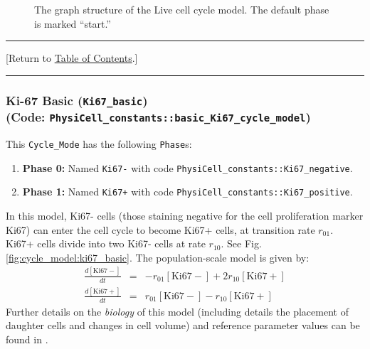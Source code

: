 \documentclass[12pt]{article}
\newcommand{\beqa}{\begin{eqnarray}}
\newcommand{\eeqa}{\end{eqnarray}}
\renewcommand{\v}{\verb}
\renewcommand{\t}[1]{\left[\mathrm{#1}\right]}
\newcommand{\TOClink}{\begin{center}\hrule\vskip-10pt\phantom{.}\hfill[Return to \hyperlink{TOC}{Table of Contents}.]\hfill\phantom{.}\vskip3pt\hrule\end{center}}
\begin{document}
\begin{figure}
\begin{mdframed}[style=mystyle]
\caption{The graph structure of the Live cell cycle model. The default phase is marked 
``start.''}
\label{fig:cycle_model:live}
\end{mdframed}
\end{figure}

\TOClink 

\subsubsection{Ki-67 Basic (\texttt{Ki67\_basic})\\
(Code: \texttt{PhysiCell\_constants::basic\_Ki67\_cycle\_model})}
\label{sec:Standard_Models:Ki67_Basic}
This \v|Cycle_Mode| has the following \v|Phase|s: 
\begin{enumerate}
\item 
\textbf{Phase 0:} Named \v|Ki67-| with code \v|PhysiCell_constants::Ki67_negative|. 

\item 
\textbf{Phase 1:} Named \v|Ki67+| with code \v|PhysiCell_constants::Ki67_positive|. 
\end{enumerate}

In this model, Ki67- cells (those staining negative for the 
cell proliferation marker Ki67) can enter the cell cycle to 
become Ki67+ cells, at transition rate $r_{01}$. Ki67+ cells 
divide into two Ki67- cells at rate $r_{10}$. 
See Fig. \ref{fig:cycle_model:ki67_basic}. The 
population-scale model is given by: 
\beqa
\frac{d\t{Ki67-}}{dt} & = & -r_{01} \t{Ki67-} + 2 r_{10} \t{Ki67+} \\
\frac{d\t{Ki67+}}{dt} & = &  r_{01} \t{Ki67-} -r_{10} \t{Ki67+} 
\eeqa
Further details on the \emph{biology} of this model (including 
details the placement of daughter cells and changes in cell 
volume) and reference parameter values can be found in \cite{ref:PhysiCell}. 
\end{document}
